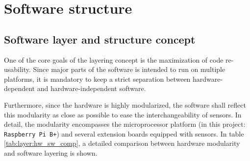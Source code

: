 \chapter{Software structure}
\label{sec:software}

\section{Software layer and structure concept}
\label{sec:software:layerAndStruct}

One of the core goals of the layering concept is the maximization of code re-usability. Since major parts of the software is intended to run on multiple platforms, it is mandatory to keep a strict separation between hardware-dependent and hardware-independent software. 

Furthermore, since the hardware is highly modularized, the software shall reflect this modularity as close as possible to ease the interchangeability of sensors. In detail, the modularity encompasses the microprocessor platform (in this project: \texttt{Raspberry Pi B+}) and several extension boards equipped with sensors. In table \ref{tab:layer:hw_sw_comp}, a detailed comparison between hardware modularity and software layering is shown.

